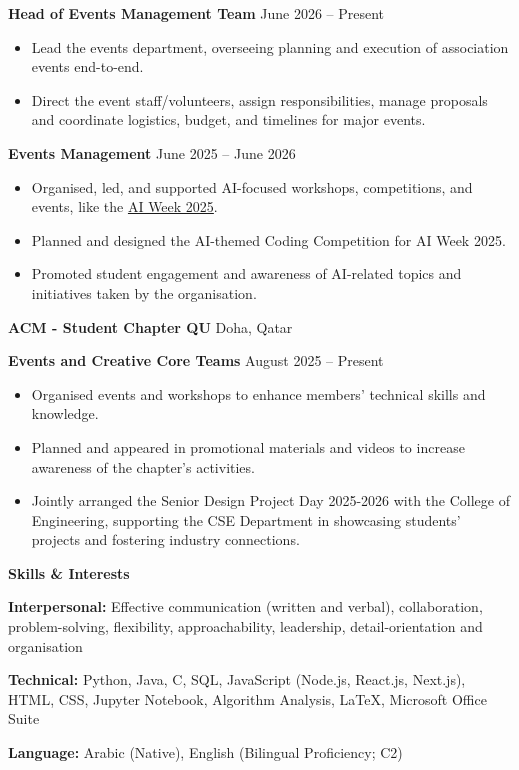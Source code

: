 \documentclass[10pt]{article}
\begin{document}
\textbf{Head of Events Management Team} \hfill June 2026 – Present
\begin{itemize}[noitemsep, topsep=0pt, partopsep=0pt, parsep=0pt]
    \item Lead the events department, overseeing planning and execution of association events end-to-end.
    \item Direct the event staff/volunteers, assign responsibilities, manage proposals and coordinate logistics, budget, and
    timelines for major events.
\end{itemize}
\textbf{Events Management} \hfill June 2025 – June 2026
\begin{itemize}[noitemsep, topsep=0pt, partopsep=0pt, parsep=0pt]
    \item Organised, led, and supported AI-focused workshops, competitions, and events, like the \href{https://www.linkedin.com/posts/aiqu-qa_ai-artificialintelligence-qatar-activity-7387784773487886336-Ev2m?utm_source=share&utm_medium=member_desktop&rcm=ACoAAFq0VV8Bty7VdT-TdPZ-m6-uVtYfdPzJaB0}{AI Week 2025}. 
    \item Planned and designed the AI-themed Coding Competition for AI Week 2025.
    \item Promoted student engagement and awareness of AI-related topics and initiatives taken by the organisation.
\end{itemize}

\vspace{8pt}

\textbf{ACM - Student Chapter QU} \hfill Doha, Qatar

\textbf{Events and Creative Core Teams} \hfill August 2025 – Present
\begin{itemize}[noitemsep, topsep=0pt, partopsep=0pt, parsep=0pt]
    \item Organised events and workshops to enhance members' technical skills and knowledge.
    \item Planned and appeared in promotional materials and videos to increase awareness of the chapter's activities.
    \item Jointly arranged the Senior Design Project Day 2025-2026 with the College of Engineering, supporting the CSE Department in showcasing students' projects and fostering industry connections.
\end{itemize}

\begin{center}
    \fontsize{11}{13}\textbf{Skills \& Interests}
\end{center}

\textbf{Interpersonal:} Effective communication (written and verbal), collaboration, problem-solving, flexibility, approachability, leadership,
detail-orientation and organisation

\textbf{Technical:} Python, Java, C, SQL, JavaScript (Node.js, React.js, Next.js), HTML, CSS, Jupyter Notebook, Algorithm Analysis, LaTeX, Microsoft Office Suite

\textbf{Language:} Arabic (Native), English (Bilingual Proficiency; C2)
\end{document}
